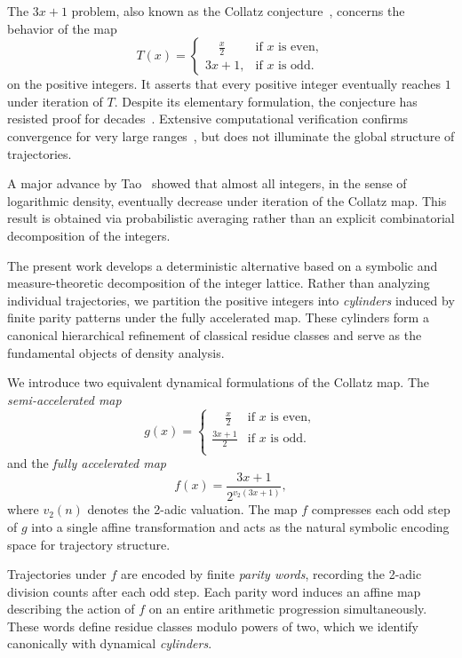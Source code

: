 \documentclass[12pt, oneside]{article}   	%
\numberwithin{equation}{section}          %
\theoremstyle{definition}
\begin{document}
The $3x+1$ problem, also known as the Collatz conjecture~\cite{Collatz1937}, concerns
the behavior of the map
\[
T(x) =
\begin{cases}
\displaystyle
    \phantom{3x} \frac{x}{2} & \text {if } x \text{ is even}, \\[8pt]
\displaystyle
    3x+1,                    & \text{if $x$ is odd}.
\end{cases}
\]
on the positive integers. It asserts that every positive integer eventually reaches $1$
under iteration of $T$. Despite its elementary formulation, the conjecture has resisted
proof for decades~\cite{Lagarias2010,Terras1976}. Extensive computational verification
confirms convergence for very large ranges~\cite{OliveiraESilva2010}, but does not
illuminate the global structure of trajectories.

A major advance by Tao~\cite{Tao2019} showed that almost all integers, in the sense of
logarithmic density, eventually decrease under iteration of the Collatz map. This result
is obtained via probabilistic averaging rather than an explicit combinatorial
decomposition of the integers.

The present work develops a deterministic alternative based on a symbolic and measure-theoretic
decomposition of the integer lattice. Rather than analyzing individual trajectories, we
partition the positive integers into \emph{cylinders} induced by finite parity patterns
under the fully accelerated map. These cylinders form a canonical hierarchical refinement
of classical residue classes and serve as the fundamental objects of density analysis.

We introduce two equivalent dynamical formulations of the Collatz map. The
\emph{semi-accelerated map}
\[
g(x) =
\begin{cases}
\displaystyle
    \phantom{3x} \frac{x}{2} & \text {if } x \text{ is even}, \\[8pt]
\displaystyle
    \frac{3x+1}{2}           & \text {if } x \text{ is odd}. \\
\end{cases}
\]
and the \emph{fully accelerated map}
\[
f(x)=\frac{3x+1}{2^{v_2(3x+1)}},
\]
where $v_2(n)$ denotes the 2-adic valuation. The map $f$ compresses each odd step of $g$
into a single affine transformation and acts as the natural symbolic encoding space for
trajectory structure.

Trajectories under $f$ are encoded by finite \emph{parity words}, recording the
2-adic division counts after each odd step. Each parity word induces an affine map
describing the action of $f$ on an entire arithmetic progression simultaneously. These
words define residue classes modulo powers of two, which we identify canonically with
dynamical \emph{cylinders}.
\end{document}
